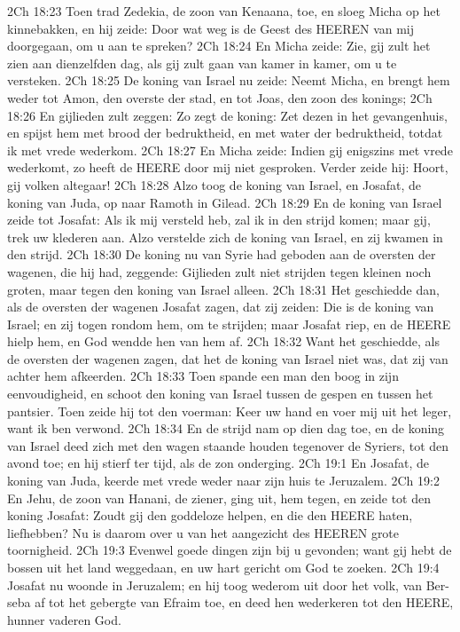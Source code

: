 2Ch 18:23  Toen trad Zedekia, de zoon van Kenaana, toe, en sloeg Micha op het kinnebakken, en hij zeide: Door wat weg is de Geest des HEEREN van mij doorgegaan, om u aan te spreken?
2Ch 18:24  En Micha zeide: Zie, gij zult het zien aan dienzelfden dag, als gij zult gaan van kamer in kamer, om u te versteken.
2Ch 18:25  De koning van Israel nu zeide: Neemt Micha, en brengt hem weder tot Amon, den overste der stad, en tot Joas, den zoon des konings;
2Ch 18:26  En gijlieden zult zeggen: Zo zegt de koning: Zet dezen in het gevangenhuis, en spijst hem met brood der bedruktheid, en met water der bedruktheid, totdat ik met vrede wederkom.
2Ch 18:27  En Micha zeide: Indien gij enigszins met vrede wederkomt, zo heeft de HEERE door mij niet gesproken. Verder zeide hij: Hoort, gij volken altegaar!
2Ch 18:28  Alzo toog de koning van Israel, en Josafat, de koning van Juda, op naar Ramoth in Gilead.
2Ch 18:29  En de koning van Israel zeide tot Josafat: Als ik mij versteld heb, zal ik in den strijd komen; maar gij, trek uw klederen aan. Alzo verstelde zich de koning van Israel, en zij kwamen in den strijd.
2Ch 18:30  De koning nu van Syrie had geboden aan de oversten der wagenen, die hij had, zeggende: Gijlieden zult niet strijden tegen kleinen noch groten, maar tegen den koning van Israel alleen.
2Ch 18:31  Het geschiedde dan, als de oversten der wagenen Josafat zagen, dat zij zeiden: Die is de koning van Israel; en zij togen rondom hem, om te strijden; maar Josafat riep, en de HEERE hielp hem, en God wendde hen van hem af.
2Ch 18:32  Want het geschiedde, als de oversten der wagenen zagen, dat het de koning van Israel niet was, dat zij van achter hem afkeerden.
2Ch 18:33  Toen spande een man den boog in zijn eenvoudigheid, en schoot den koning van Israel tussen de gespen en tussen het pantsier. Toen zeide hij tot den voerman: Keer uw hand en voer mij uit het leger, want ik ben verwond.
2Ch 18:34  En de strijd nam op dien dag toe, en de koning van Israel deed zich met den wagen staande houden tegenover de Syriers, tot den avond toe; en hij stierf ter tijd, als de zon onderging.
2Ch 19:1  En Josafat, de koning van Juda, keerde met vrede weder naar zijn huis te Jeruzalem.
2Ch 19:2  En Jehu, de zoon van Hanani, de ziener, ging uit, hem tegen, en zeide tot den koning Josafat: Zoudt gij den goddeloze helpen, en die den HEERE haten, liefhebben? Nu is daarom over u van het aangezicht des HEEREN grote toornigheid.
2Ch 19:3  Evenwel goede dingen zijn bij u gevonden; want gij hebt de bossen uit het land weggedaan, en uw hart gericht om God te zoeken.
2Ch 19:4  Josafat nu woonde in Jeruzalem; en hij toog wederom uit door het volk, van Ber-seba af tot het gebergte van Efraim toe, en deed hen wederkeren tot den HEERE, hunner vaderen God.

